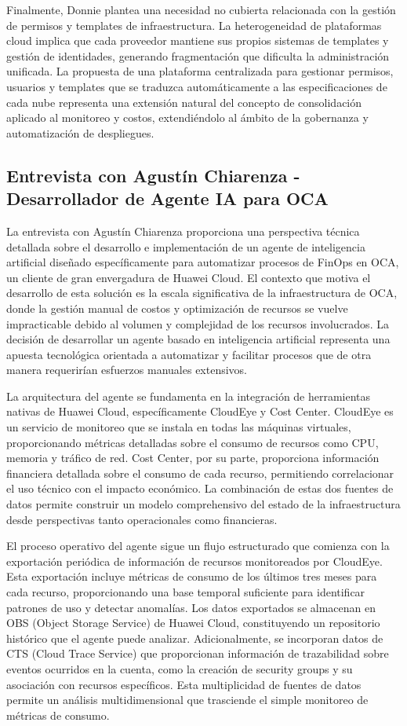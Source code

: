 Finalmente, Donnie plantea una necesidad no cubierta relacionada con la gestión de permisos y templates de infraestructura. La heterogeneidad de plataformas cloud implica que cada proveedor mantiene sus propios sistemas de templates y gestión de identidades, generando fragmentación que dificulta la administración unificada. La propuesta de una plataforma centralizada para gestionar permisos, usuarios y templates que se traduzca automáticamente a las especificaciones de cada nube representa una extensión natural del concepto de consolidación aplicado al monitoreo y costos, extendiéndolo al ámbito de la gobernanza y automatización de despliegues.

\subsection{Entrevista con Agustín Chiarenza - Desarrollador de Agente IA para OCA}

La entrevista con Agustín Chiarenza proporciona una perspectiva técnica detallada sobre el desarrollo e implementación de un agente de inteligencia artificial diseñado específicamente para automatizar procesos de FinOps en OCA, un cliente de gran envergadura de Huawei Cloud. El contexto que motiva el desarrollo de esta solución es la escala significativa de la infraestructura de OCA, donde la gestión manual de costos y optimización de recursos se vuelve impracticable debido al volumen y complejidad de los recursos involucrados. La decisión de desarrollar un agente basado en inteligencia artificial representa una apuesta tecnológica orientada a automatizar y facilitar procesos que de otra manera requerirían esfuerzos manuales extensivos.

La arquitectura del agente se fundamenta en la integración de herramientas nativas de Huawei Cloud, específicamente CloudEye y Cost Center. CloudEye es un servicio de monitoreo que se instala en todas las máquinas virtuales, proporcionando métricas detalladas sobre el consumo de recursos como CPU, memoria y tráfico de red. Cost Center, por su parte, proporciona información financiera detallada sobre el consumo de cada recurso, permitiendo correlacionar el uso técnico con el impacto económico. La combinación de estas dos fuentes de datos permite construir un modelo comprehensivo del estado de la infraestructura desde perspectivas tanto operacionales como financieras.

El proceso operativo del agente sigue un flujo estructurado que comienza con la exportación periódica de información de recursos monitoreados por CloudEye. Esta exportación incluye métricas de consumo de los últimos tres meses para cada recurso, proporcionando una base temporal suficiente para identificar patrones de uso y detectar anomalías. Los datos exportados se almacenan en OBS (Object Storage Service) de Huawei Cloud, constituyendo un repositorio histórico que el agente puede analizar. Adicionalmente, se incorporan datos de CTS (Cloud Trace Service) que proporcionan información de trazabilidad sobre eventos ocurridos en la cuenta, como la creación de security groups y su asociación con recursos específicos. Esta multiplicidad de fuentes de datos permite un análisis multidimensional que trasciende el simple monitoreo de métricas de consumo.

